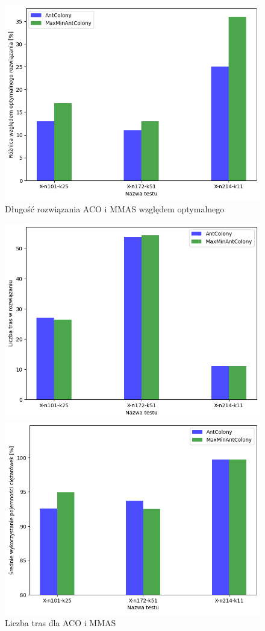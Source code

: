 \documentclass{article}
\begin{document}
\begin{figure}[H]
    \centering
    \includegraphics[width=0.48\linewidth]{img/maxmin_wzgledem_optymalnego.png}
    \caption{Długość rozwiązania ACO i MMAS względem optymalnego}
    \label{fig:MMAS_wzgledem_optymalnego}
\end{figure}

\begin{figure}[H]
    \centering
    \begin{minipage}{0.48\textwidth}
        \centering
        \includegraphics[width=\linewidth]{img/maxmin_trasy.png}
        \caption{Liczba tras dla ACO i MMAS}
        \label{fig:maxmin_trasy}
    \end{minipage}%
    \hfill
    \begin{minipage}{0.48\textwidth}
        \centering
        \includegraphics[width=\linewidth]{img/max_min_capacity.png}

\end{minipage}
\end{figure}
\end{document}
